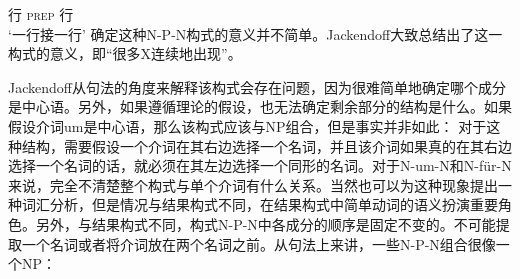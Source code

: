 \begin{exe}
\begin{xlist}[iv.]
\begin{exe}
\begin{xlist}[iv.]
	 行 \textsc{prep} 行\\
\glt `一行接一行'
\zl
确定这种N-P-N构式的意义并不简单。Jackendoff大致总结出了这一构式的意义，即“很多X连续地出现”。

Jackendoff从句法的角度来解释该构式会存在问题，因为很难简单地确定哪个成分是中心语。另外，如果遵循\xbarc 理论的假设，也无法确定剩余部分的结构是什么。如果假设介词um是中心语，那么该构式应该与NP组合，但是事实并非如此：
\eal
{} 
\zl
对于这种结构，需要假设一个介词在其右边选择一个名词，并且该介词如果真的在其右边选择一个名词的话，就必须在其左边选择一个同形的名词。对于N-um-N和N-für-N来说，完全不清楚整个构式与单个介词有什么关系。当然也可以为这种现象提出一种词汇分析，但是情况与结果构式不同，在结果构式中简单动词的语义扮演重要角色。另外，与结果构式不同，构式N-P-N中各成分的顺序是固定不变的。不可能提取一个名词或者将介词放在两个名词之前。从句法上来讲，一些N-P-N组合很像一个NP\citep[]{Jackendoff2008a}：

\end{xlist}
\end{exe}
\end{xlist}
\end{exe}
